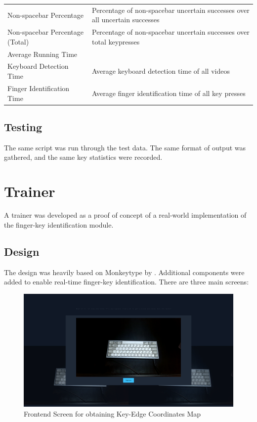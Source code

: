 \documentclass{report}
\begin{document}
\begin{table}[H]
\begin{tabular}{ p{} p{} }
		Non-spacebar Percentage                  & Percentage of non-spacebar uncertain successes over all uncertain successes             \\
		Non-spacebar Percentage \newline (Total) & Percentage of non-spacebar uncertain successes over total keypresses
		\\[0.25cm]
		\midrule
		Average Running Time                                                                                                               \\
		\midrule
		Keyboard Detection Time                  & Average keyboard detection time of all videos                                           \\
		Finger Identification Time               & Average finger identification time of all key presses                                   \\
		\bottomrule
	\end{tabular}
\end{table}

\subsection{Testing}
The same script was run through the test data. The same format of output was
gathered, and the same key statistics were recorded.

\section{Trainer}
A trainer was developed as a proof of concept of a real-world implementation of
the finger-key identification module.

\subsection{Design}
The design was heavily based on Monkeytype by \textcite{bartnik2021}. Additional
components were added to enable real-time finger-key identification. There are
three main screens:

\begin{figure}[H]
	\centering
	\includegraphics[width=1\textwidth]{frontend-edge-coords.png}
	\caption{Frontend Screen for obtaining Key-Edge Coordinates Map}
	\label{fig:metho-front-coords}
	\centering
\end{figure}
\end{document}

